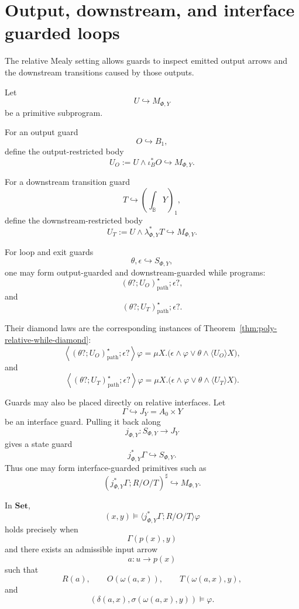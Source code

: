 \section{Output, downstream, and interface guarded loops}
\label{sec:poly-relative-output-downstream-interface-guards}

The relative Mealy setting allows guards to inspect emitted output arrows and
the downstream transitions caused by those outputs.

Let
\[
U\hookrightarrow M_{\Phi,Y}
\]
be a primitive subprogram.

For an output guard
\[
O\hookrightarrow B_1,
\]
define the output-restricted body
\[
U_O:=U\wedge\iota_B^\ast O\hookrightarrow M_{\Phi,Y}.
\]

For a downstream transition guard
\[
T\hookrightarrow\left(\int_{\mathbb B}Y\right)_1,
\]
define the downstream-restricted body
\[
U_T:=U\wedge\lambda_{\Phi,Y}^\ast T\hookrightarrow M_{\Phi,Y}.
\]

For loop and exit guards
\[
\theta,\epsilon\hookrightarrow S_{\Phi,Y},
\]
one may form output-guarded and downstream-guarded while programs:
\[
(\theta?;U_O)^\star_{\mathrm{path}};\epsilon?,
\]
and
\[
(\theta?;U_T)^\star_{\mathrm{path}};\epsilon?.
\]

Their diamond laws are the corresponding instances of
Theorem~\ref{thm:poly-relative-while-diamond}:
\[
\left\langle
(\theta?;U_O)^\star_{\mathrm{path}};\epsilon?
\right\rangle\varphi
=
\mu X.\bigl(
\epsilon\wedge\varphi
\vee
\theta\wedge\langle U_O\rangle X
\bigr),
\]
and
\[
\left\langle
(\theta?;U_T)^\star_{\mathrm{path}};\epsilon?
\right\rangle\varphi
=
\mu X.\bigl(
\epsilon\wedge\varphi
\vee
\theta\wedge\langle U_T\rangle X
\bigr).
\]

Guards may also be placed directly on relative interfaces.  Let
\[
\Gamma\hookrightarrow J_Y=A_0\times Y
\]
be an interface guard.  Pulling it back along
\[
j_{\Phi,Y}:S_{\Phi,Y}\to J_Y
\]
gives a state guard
\[
j_{\Phi,Y}^\ast\Gamma\hookrightarrow S_{\Phi,Y}.
\]
Thus one may form interface-guarded primitives such as
\[
(j_{\Phi,Y}^\ast\Gamma;R/O/T)^\sharp
\hookrightarrow M_{\Phi,Y}.
\]

\begin{proposition}
\label{prop:poly-relative-interface-guarded-external}
In \(\mathbf{Set}\),
\[
(x,y)\models
\langle j_{\Phi,Y}^\ast\Gamma;R/O/T\rangle\varphi
\]
holds precisely when
\[
\Gamma(p(x),y)
\]
and there exists an admissible input arrow
\[
a:u\to p(x)
\]
such that
\[
R(a),
\qquad
O(\omega(a,x)),
\qquad
T(\omega(a,x),y),
\]
and
\[
\left(
\delta(a,x),
\sigma(\omega(a,x),y)
\right)
\models\varphi.
\]
\end{proposition}

